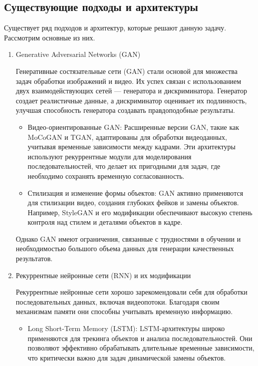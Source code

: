 \subsection{Существующие подходы и архитектуры}

Существует ряд подходов и архитектур, которые решают данную задачу. Рассмотрим основные из них.


\begin{enumerate}
    \item Generative Adversarial Networks (GAN)

    Генеративные состязательные сети (GAN) стали основой для множества задач обработки изображений и видео. Их успех связан с использованием двух взаимодействующих сетей — генератора и дискриминатора. Генератор создает реалистичные данные, а дискриминатор оценивает их подлинность, улучшая способность генератора создавать правдоподобные результаты.

    \begin{itemize}
        \item Видео-ориентированные GAN: Расширенные версии GAN, такие как MoCoGAN и TGAN, адаптированы для обработки видеоданных, учитывая временные зависимости между кадрами. Эти архитектуры используют рекуррентные модули для моделирования последовательностей, что делает их пригодными для задач, где необходимо сохранять временную согласованность.
        
        \item Стилизация и изменение формы объектов: GAN активно применяются для стилизации видео, создания глубоких фейков и замены объектов. Например, StyleGAN и его модификации обеспечивают высокую степень контроля над стилем и деталями объектов в кадре.

    \end{itemize}

    Однако GAN имеют ограничения, связанные с трудностями в обучении и необходимостью большого объема данных для генерации качественных результатов.

    \item Рекуррентные нейронные сети (RNN) и их модификации

    Рекуррентные нейронные сети хорошо зарекомендовали себя для обработки последовательных данных, включая видеопотоки. Благодаря своим механизмам памяти они способны учитывать временную информацию.

    \begin{itemize}
        \item Long Short-Term Memory (LSTM): LSTM-архитектуры широко применяются для трекинга объектов и анализа последовательностей. Они позволяют эффективно обрабатывать длительные временные зависимости, что критически важно для задач динамической замены объектов.


\end{itemize}
\end{enumerate}
